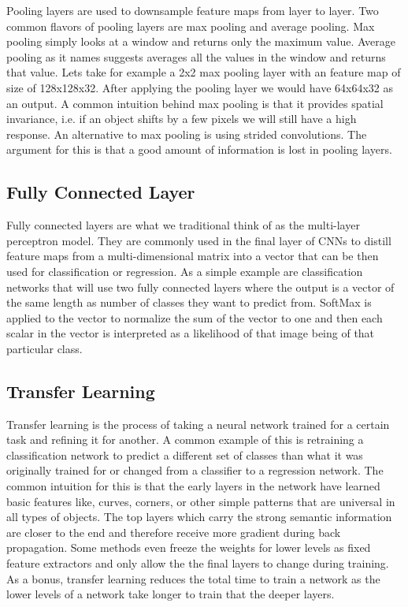Pooling layers are used to downsample feature maps from layer to layer. Two common flavors of pooling layers are max pooling and average pooling. Max pooling simply looks at a window and returns only the maximum value. Average pooling as it names suggests averages all the values in the window and returns that value. Lets take for example a 2x2 max pooling layer with an feature map of size of 128x128x32. After applying the pooling layer we would have 64x64x32 as an output. A common intuition behind max pooling is that it provides spatial invariance, i.e. if an object shifts by a few pixels we will still have a high response. An alternative to max pooling is using strided convolutions. The argument for this is that a good amount of information is lost in pooling layers.

\subsection{Fully Connected Layer}

Fully connected layers are what we traditional think of as the multi-layer perceptron model. They are commonly used in the final layer of CNNs to distill feature maps from a multi-dimensional matrix into a vector that can be then used for classification or regression. As a simple example are classification networks that will use two fully connected layers where the output is a vector of the same length as number of classes they want to predict from. SoftMax is applied to the vector to normalize the sum of the vector to one and then each scalar in the vector is interpreted as a likelihood of that image being of that particular class.

\subsection{Transfer Learning}

Transfer learning is the process of taking a neural network trained for a certain task and refining it for another. A common example of this is retraining a classification network to predict a different set of classes than what it was originally trained for or changed from a classifier to a regression network. The common intuition for this is that the early layers in the network have learned basic features like, curves, corners, or other simple patterns that are universal in all types of objects. The top layers which carry the strong semantic information are closer to the end and therefore receive more gradient during back propagation. Some methods even freeze the weights for lower levels as fixed feature extractors and only allow the the final layers to change during training. As a bonus, transfer learning reduces the total time to train a network as the lower levels of a network take longer to train that the deeper layers.

